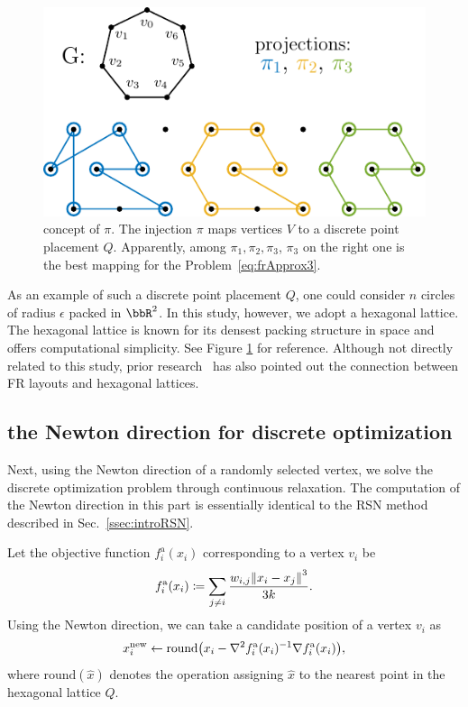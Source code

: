 \documentclass[dvipdfmx,journal]{IEEEtran}
\newcommand{\defeq}{\coloneqq}
\begin{document}
\begin{figure}[t]
    \centering
    \includegraphics[width=\columnwidth]{pi/pi.pdf}
    \caption{
        concept of $\pi$.
        The injection $\pi$ maps vertices $V$ to a discrete point placement $Q$.
        Apparently, among $\pi_1, \pi_2, \pi_3$, $\pi_3$ on the right one is the best mapping for the Problem~\eqref{eq:frApprox3}.
    }
    \label{fig:pi}
\end{figure}

As an example of such a discrete point placement $Q$, one could consider $n$ circles of radius $\epsilon$ packed in $\bbR^2$.
In this study, however, we adopt a hexagonal lattice.
The hexagonal lattice is known for its densest packing structure in space and offers computational simplicity.
See Figure \ref{fig:pi} for reference.
Although not directly related to this study, prior research~\cite{s22145179} has also pointed out the connection between FR layouts and hexagonal lattices.

\subsection{the Newton direction for discrete optimization}\label{ssec:newtonDirection}

Next, using the Newton direction of a randomly selected vertex, we solve the discrete optimization problem through continuous relaxation. The computation of the Newton direction in this part is essentially identical to the RSN method described in Sec.~\ref{ssec:introRSN}.

Let the objective function $f^{\mathrm{a}}_i(x_i)$ corresponding to a vertex $v_i$ be
\begin{equation*}
    f^{\mathrm{a}}_i(x_i) \defeq \sum_{j \neq i} \frac{w_{i,j}\norm{x_i - x_j}^3}{3k}.
\end{equation*}
Using the Newton direction, we can take a candidate position of a vertex $v_i$ as
\begin{equation*}
    x_i^\mathrm{new} \gets \mathrm{round}\qty(x_i - \nabla^2 f^{\mathrm{a}}_i(x_i)^{-1} \nabla f^{\mathrm{a}}_i(x_i)),
\end{equation*}
where $\mathrm{round}(\hat{x})$ denotes the operation assigning $\hat{x}$ to the nearest point in the hexagonal lattice $Q$.
\end{document}
